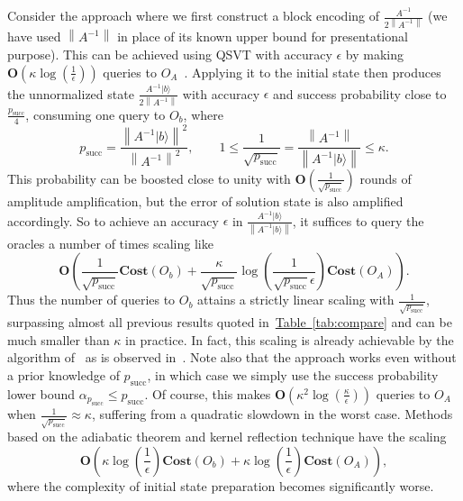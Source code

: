 \documentclass[letterpaper,onecolumn,11pt,accepted=2026-02-14]{quantumarticle}
\newcommand{\norm}[1]{\left\lVert#1\right\rVert}
\theoremstyle{remark}
\theoremstyle{plain}
\newcommand{\tab}[1]{\hyperref[tab:#1]{Table~\ref*{tab:#1}}}
\newcommand{\ket}[1]{|#1\rangle}
\begin{document}
Consider the approach where we first construct a block encoding of $\frac{A^{-1}}{2\norm{A^{-1}}}$ (we have used $\norm{A^{-1}}$ in place of its known upper bound for presentational purpose). This can be achieved using QSVT with accuracy $\epsilon$ by making $\mathbf{O}\left(\kappa\log\left(\frac{1}{\epsilon}\right)\right)$ queries to $O_A$~\cite[Corollary 69]{Gilyen2018singular}. Applying it to the initial state then produces the unnormalized state $\frac{A^{-1}\ket{b}}{2\norm{A^{-1}}}$ with accuracy $\epsilon$ and success probability close to $\frac{p_{\text{succ}}}{4}$, consuming one query to $O_b$, where
\begin{equation}
    p_{\text{succ}}=\frac{\norm{A^{-1}\ket{b}}^2}{\norm{A^{-1}}^2},\qquad
    1\leq \frac{1}{\sqrt{p_{\text{succ}}}}=\frac{\norm{A^{-1}}}{\norm{A^{-1}\ket{b}}}\leq \kappa.
\end{equation}
This probability can be boosted close to unity with $\mathbf{O}\left(\frac{1}{\sqrt{p_{\text{succ}}}}\right)$ rounds of amplitude amplification, but the error of solution state is also amplified accordingly. So to achieve an accuracy $\epsilon$ in $\frac{A^{-1}\ket{b}}{\norm{A^{-1}\ket{b}}}$, it suffices to query the oracles a number of times scaling like
\begin{equation}
    \mathbf{O}\left(\frac{1}{\sqrt{p_{\text{succ}}}}\mathbf{Cost}(O_b)
    +\frac{\kappa}{\sqrt{p_{\text{succ}}}}\log\left(\frac{1}{\sqrt{p_{\text{succ}}}\epsilon}\right)\mathbf{Cost}\left(O_A\right)\right).
\end{equation}
Thus the number of queries to $O_b$ attains a strictly linear scaling with $\frac{1}{\sqrt{p_{\text{succ}}}}$, surpassing almost all previous results quoted in~\tab{compare} and can be much smaller than $\kappa$ in practice.
In fact, this scaling is already achievable by the algorithm of~\cite{Harrow2009} as is observed in~\cite{PRXQuantum.2.010315}.
Note also that the approach works even without a prior knowledge of $p_{\text{succ}}$, in which case we simply use the success probability lower bound $\alpha_{p_{\text{succ}}}\leq p_{\text{succ}}$.
Of course, this makes $\mathbf{O}\left(\kappa^2\log\left(\frac{\kappa}{\epsilon}\right)\right)$ queries to $O_A$ when $\frac{1}{\sqrt{p_{\text{succ}}}}\approx\kappa$, suffering from a quadratic slowdown in the worst case.
Methods based on the adiabatic theorem and kernel reflection technique have the scaling
\begin{equation}
    \mathbf{O}\left(\kappa\log\left(\frac{1}{\epsilon}\right)\mathbf{Cost}(O_b)
    +\kappa\log\left(\frac{1}{\epsilon}\right)\mathbf{Cost}(O_A)\right),
\end{equation}
where the complexity of initial state preparation becomes significantly worse.
\end{document}
